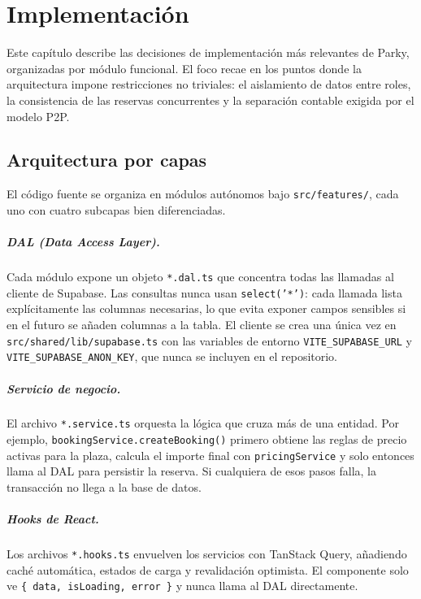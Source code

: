 \chapter{Implementación}
\label{ch:implementacion}

Este capítulo describe las decisiones de implementación más relevantes de Parky, organizadas por módulo funcional. El foco recae en los puntos donde la arquitectura impone restricciones no triviales: el aislamiento de datos entre roles, la consistencia de las reservas concurrentes y la separación contable exigida por el modelo P2P.

\section{Arquitectura por capas}
\label{sec:arquitectura_capas}

El código fuente se organiza en módulos autónomos bajo \texttt{src/features/}, cada uno con cuatro subcapas bien diferenciadas.

\paragraph{DAL (\textit{Data Access Layer}).}
Cada módulo expone un objeto \texttt{*.dal.ts} que concentra todas las llamadas al cliente de Supabase. Las consultas nunca usan \texttt{select('*')}: cada llamada lista explícitamente las columnas necesarias, lo que evita exponer campos sensibles si en el futuro se añaden columnas a la tabla. El cliente se crea una única vez en \texttt{src/shared/lib/supabase.ts} con las variables de entorno \texttt{VITE\_SUPABASE\_URL} y \texttt{VITE\_SUPABASE\_ANON\_KEY}, que nunca se incluyen en el repositorio.

\paragraph{Servicio de negocio.}
El archivo \texttt{*.service.ts} orquesta la lógica que cruza más de una entidad. Por ejemplo, \texttt{bookingService.createBooking()} primero obtiene las reglas de precio activas para la plaza, calcula el importe final con \texttt{pricingService} y solo entonces llama al DAL para persistir la reserva. Si cualquiera de esos pasos falla, la transacción no llega a la base de datos.

\paragraph{Hooks de React.}
Los archivos \texttt{*.hooks.ts} envuelven los servicios con TanStack Query, añadiendo caché automática, estados de carga y revalidación optimista. El componente solo ve \texttt{\{ data, isLoading, error \}} y nunca llama al DAL directamente.

